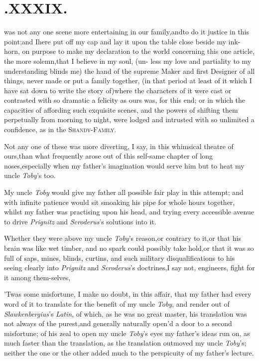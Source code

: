 \documentclass{article}
\begin{document}
\section{.\quad  XXXIX.}

 was not any one scene more
entertaining in our family,\tsk and\break to do it justice in this
point;\tsh and I\break here put off my cap and lay it upon the\break
table close beside my ink-horn, on purpose to make my declaration
to the world concerning this one article, the more
so\-lemn,\tsh that I believe in my soul, (un- less my love and
partiality to my understanding blinds me) the hand of the su\-preme
Maker and first Designer of all things, never made or put a family
together, (in that period at least of it which I have sat down to
write the story of)\tsh where the characters of it were cast
or contrasted with so dramatic a felicity as ours was, for this
end; or in which the\break
capacities of affording such exquisite\break
scenes, and the powers of shifting them perpetually from morning to night,
were lodged and intrusted with so unlimited a confidence, as in the
\textsc{Shandy-Family}.

Not any one of these was more diverting, I say, in this
whimsical theatre of ours,\tsk than what frequently arose
out of this self-same chapter of long noses,\tsh especially
when my father’s imagination  would serve him but to heat my uncle \textit{Toby}’s
too.

My uncle \textit{Toby} would give my father all possible fair play
in this attempt; and with infinite patience would sit smoaking his
pipe for whole hours together, whilst my father was practising upon
his head, and trying every accessible avenue to drive
\textit{Prignitz} and \textit{Scroderus}’s solutions into it.

Whether they were above my uncle \textit{Toby}’s
reason,\tsh or contrary to it,\tsh or that his brain was like wet
timber, and no spark could possibly take hold,\tsh or that
it was so full of saps, mines, blinds, curtins, and such military
disqualifications to his seeing clearly into \textit{Prignitz} and
\textit{Scroderus}’s doctrines,\tsh I say not,\tsk 
{} 
engineers, fight for it among them-\break selves,\tsh

’Twas some misfortune, I make no\break
doubt, in this affair,
that my father had every word of it to translate for the benefit of
my uncle \textit{Toby}, and render out of
\textit{Slawkenbergius}’s \textit{Latin}, of which, as he was no
great master, his translation was not always of the
purest,\tsk and generally\break {} naturally open’d a door to a second
misfortune;\tsk {}\break
of his zeal to open my uncle \textit{Toby}’s eyes\break
\tsh my father’s ideas run on, as much faster than the translation, as
the translation outmoved my uncle
\textit{Toby}’s;\tsh\break
neither the one or the other added much\break
to the perspicuity of my father’s lecture.
\end{document}
